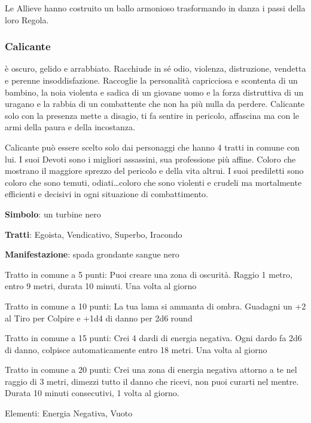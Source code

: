 \documentclass[a4paper,11pt,twoside,openany]{book}
\begin{document}
Le Allieve hanno costruito un ballo armonioso trasformando in danza i passi della loro Regola.

\subsubsection{Calicante}

\label{calicante}

è oscuro, gelido e arrabbiato. Racchiude in sé odio, violenza, distruzione, vendetta e perenne insoddisfazione. Raccoglie la personalità capricciosa e scontenta di un bambino, la noia violenta e sadica di un giovane uomo e la forza distruttiva di un uragano e la rabbia di un combattente che non ha più nulla da perdere. Calicante solo con la presenza mette a disagio, ti fa sentire in pericolo, affascina ma con le armi della paura e della incostanza.

Calicante può essere scelto solo dai personaggi che hanno 4 tratti in comune con lui. I suoi Devoti sono i migliori assassini, sua professione più affine. Coloro che mostrano il maggiore sprezzo del pericolo e della vita altrui. I suoi prediletti sono coloro che sono temuti, odiati\ldots coloro che sono violenti e crudeli ma mortalmente efficienti e decisivi in ogni situazione di combattimento.

\textbf{Simbolo}: un turbine nero

\textbf{Tratti}: Egoista, Vendicativo, Superbo, Iracondo

\textbf{Manifestazione}: spada grondante sangue nero

\bigskip

Tratto in comune a 5 punti: Puoi creare una zona di oscurità. Raggio 1 metro, entro 9 metri, durata 10 minuti. Una volta al giorno

Tratto in comune a 10 punti: La tua lama si ammanta di ombra. Guadagni un +2 al Tiro per Colpire e +1d4 di danno per 2d6 round

Tratto in comune a 15 punti: Crei 4 dardi di energia negativa. Ogni dardo fa 2d6 di danno, colpisce automaticamente entro 18 metri. Una volta al giorno

Tratto in comune a 20 punti: Crei una zona di energia negativa attorno a te nel raggio di 3 metri, dimezzi tutto il danno che ricevi, non puoi curarti nel mentre. Durata 10 minuti consecutivi, 1 volta al giorno.

\bigskip

Elementi: Energia Negativa, Vuoto
\end{document}
